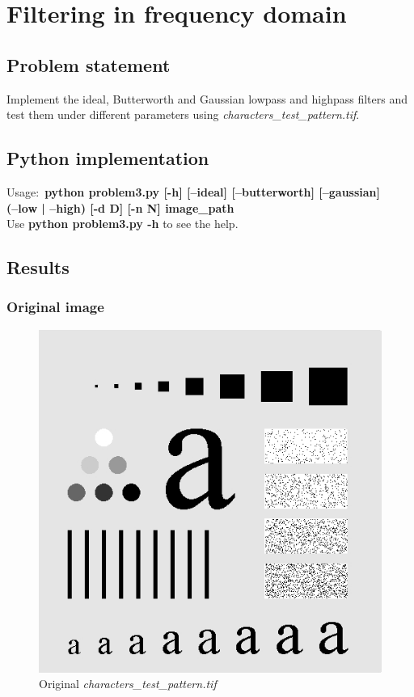 \chapter{Filtering in frequency domain}

\section{Problem statement}

Implement the ideal, Butterworth and Gaussian lowpass and highpass filters
and test them under different parameters using \textit{characters\_test\_pattern.tif}.

\section{Python implementation}

Usage:~\textbf{python problem3.py [-h] [--ideal] [--butterworth] [--gaussian] \\
(--low | --high) [-d D] [-n N] image\_path} \\

Use \textbf{python problem3.py -h} to see the help.

\section{Results}

    \subsection{Original image}

    \begin{figure}[!htb]\centering
        \includegraphics[width=0.5\linewidth]{./images/3/characters.jpg}
        \caption{Original \textit{characters\_test\_pattern.tif}}
        \label{diagram:characters}
    \end{figure}


